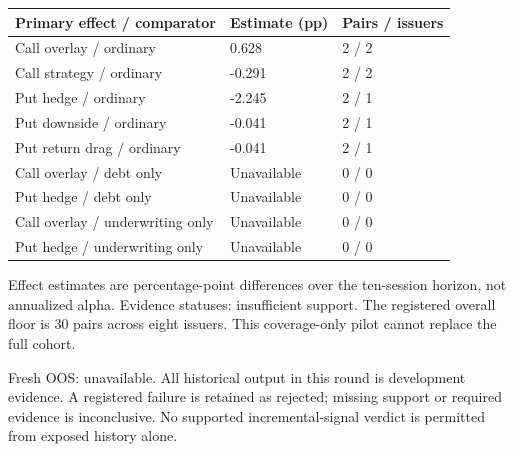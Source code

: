 \documentclass[11pt,letterpaper]{article}
\begin{document}
\begin{tabular}{@{}p{}p{}p{}@{}}
\toprule
\textbf{Primary effect / comparator} & \textbf{Estimate (pp)} & \textbf{Pairs / issuers} \\
\midrule
Call overlay / ordinary & 0.628 & 2 / 2 \\
Call strategy / ordinary & -0.291 & 2 / 2 \\
Put hedge / ordinary & -2.245 & 2 / 1 \\
Put downside / ordinary & -0.041 & 2 / 1 \\
Put return drag / ordinary & -0.041 & 2 / 1 \\
Call overlay / debt only & Unavailable & 0 / 0 \\
Put hedge / debt only & Unavailable & 0 / 0 \\
Call overlay / underwriting only & Unavailable & 0 / 0 \\
Put hedge / underwriting only & Unavailable & 0 / 0 \\
\bottomrule
\end{tabular}
\par\smallskip
Effect estimates are percentage-point differences over the ten-session horizon, not annualized alpha. Evidence statuses: insufficient support. The registered overall floor is 30 pairs across eight issuers. This coverage-only pilot cannot replace the full cohort.

Fresh OOS: unavailable. All historical output in this round is development evidence. A registered failure is retained as rejected; missing support or required evidence is inconclusive. No supported incremental-signal verdict is permitted from exposed history alone.


\clearpage
\end{document}
